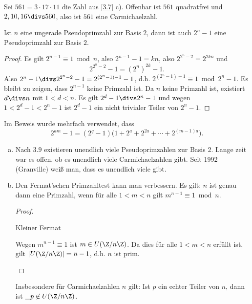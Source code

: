 \begin{ex*}
	Sei $561 = 3 \cdot 17 \cdot 11$ die Zahl aus \ref{3.7} c).
	Offenbar ist $561$ quadratfrei und $2, 10, 16 \divs 560$, also ist $561$ eine Carmichaelzahl.
\end{ex*}

\begin{lem} \label{3.9}
	Ist $n$ eine ungerade Pseudoprimzahl zur Basis $2$, dann ist auch $2^n - 1$ eine Pseudoprimzahl zur Basis $2$.
	\begin{proof}
		Es gilt $2^{n-1} \equiv 1 \bmod n$, also $2^{n-1} - 1 = kn$, also $2^{2^n-2} = 2^{2kn}$ und
		\[
			2^{2^n -2} - 1 = (2^n)^{2k} - 1.
		\]
		Also $2^n - 1 \divs 2^{2^n -2} - 1 = 2^{(2^n - 1) - 1} - 1$, d.h. $2^{(2^n - 1) - 1} \equiv 1 \bmod 2^n - 1$.
		Es bleibt zu zeigen, dass $2^{n-1}$ keine Primzahl ist.
		Da $n$ keine Primzahl ist, existiert $d \divs n$ mit $1 < d < n$.
		Es gilt $2^d - 1 \divs 2^n - 1$ und wegen $1 < 2^d - 1 < 2^n - 1$ ist $2^d - 1$ ein nicht trivialer Teiler von $2^n - 1$.
	\end{proof}
	\begin{note}
		Im Beweis wurde mehrfach verwendet, dass
		\[
			2^{am} - 1
			= (2^q - 1)\Big(1 + 2^a + 2^{2a} + \dotsb + 2^{(m-1)a} \Big).
		\]
	\end{note}
\end{lem}

\begin{nt*}
	\begin{enumerate}[a)]
		\item
			Nach $3.9$ existieren unendlich viele Pseudoprimzahlen zur Basis 2.
			Lange zeit war es offen, ob es unendlich viele Carmichaelzahlen gibt.
			Seit 1992 (Granville) weiß man, dass es unendlich viele gibt.
		\item
			Den Fermat'schen Primzahltest kann man verbessern.
			Es gilt: $n$ ist genau dann eine Primzahl, wenn für alle $1 < m < n$ gilt $m^{n-1} \equiv 1 \bmod n$.
			\begin{proof}
				\begin{segnb}{\ProofImplication}
					Kleiner Fermat
				\end{segnb}
				\begin{segnb}{\ProofImplication*}
					Wegen $m^{n-1} \equiv 1$ ist $m \in U(\Z / n\Z)$.
					Da dies für alle $1 < m < n$ erfüllt ist, gilt $|U(\Z / n\Z)| = n - 1$, d.h. $n$ ist prim.
				\end{segnb}
			\end{proof}
			Insbesondere für Carmichaelzahlen $n$ gilt:
			Ist $p$ ein echter Teiler von $n$, dann ist $\_p \not\in U(\Z / n\Z)$.
	\end{enumerate}
\end{nt*}

